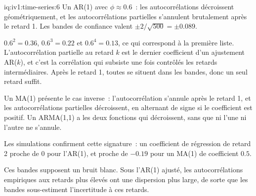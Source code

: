 \begin{solution}{iq:iv1:time-series:6}
Un AR(1) avec $\phi \approx 0.6$~: les autocorrélations décroissent géométriquement, et les autocorrélations partielles s'annulent brutalement après le retard 1. Les bandes de confiance valent $\pm 2/\sqrt{500} = \pm 0.089$.

$0.6^2 = 0.36$, $0.6^3 = 0.22$ et $0.6^4 = 0.13$, ce qui correspond à la première liste. L'autocorrélation partielle au retard $k$ est le dernier coefficient d'un ajustement AR($k$), et c'est la corrélation qui subsiste une fois contrôlés les retards intermédiaires. Après le retard 1, toutes se situent dans les bandes, donc un seul retard suffit.

Un MA(1) présente le cas inverse~: l'autocorrélation s'annule après le retard 1, et les autocorrélations partielles décroissent, en alternant de signe si le coefficient est positif. Un ARMA(1,1) a les deux fonctions qui décroissent, sans que ni l'une ni l'autre ne s'annule.

Les simulations confirment cette signature~: un coefficient de régression de retard 2 proche de 0 pour l'AR(1), et proche de $-0.19$ pour un MA(1) de coefficient $0.5$.

Ces bandes supposent un bruit blanc. Sous l'AR(1) ajusté, les autocorrélations empiriques aux retards plus élevés ont une dispersion plus large, de sorte que les bandes sous-estiment l'incertitude à ces retards.



\end{solution}

